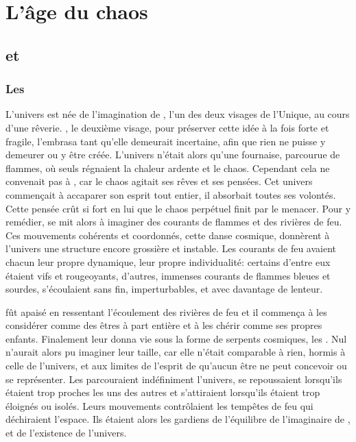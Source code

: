 \chapter{L'âge du chaos}


\section{\Mey et \Cind}


\subsection{Les \SerpentsCosmiques}

L'univers est née de l'imagination de \Mey, l'un des deux visages de l'Unique, au cours d'une rêverie. \Cind, le deuxième visage, pour préserver cette idée à la fois forte et fragile, l'embrasa tant qu'elle demeurait incertaine, afin que rien ne puisse y demeurer ou y être créée. L'univers n'était alors qu'une fournaise, parcourue de flammes, où seuls régnaient la chaleur ardente et le chaos. Cependant cela ne convenait pas à \Mey, car le chaos agitait ses rêves et ses pensées. Cet univers commençait à accaparer son esprit tout entier, il absorbait toutes ses volontés. Cette pensée crût si fort en lui que le chaos perpétuel finit par le menacer. Pour y remédier, \Cind se mit alors à imaginer des courants de flammes et des rivières de feu. Ces mouvements cohérents et coordonnés, cette danse cosmique, donnèrent à l'univers une structure encore grossière et instable. Les courants de feu avaient chacun leur propre dynamique, leur propre individualité: certains d'entre eux étaient vifs et rougeoyants, d'autres, immenses courants de flammes bleues et sourdes, s'écoulaient sans fin, imperturbables, et avec davantage de lenteur.

\Mey fût apaisé en ressentant l'écoulement des rivières de feu et il commença à les considérer comme des êtres à part entière et à les chérir comme ses propres enfants. Finalement \Mey leur donna vie sous la forme de serpents cosmiques, les \SerpentsCosmiques. Nul n'aurait alors pu imaginer leur taille, car elle n'était comparable à rien, hormis à celle de l'univers, et aux limites de l'esprit de \Mey qu'aucun être ne peut concevoir ou se représenter. Les \SerpentsCosmiques parcouraient indéfiniment l'univers, se repoussaient lorsqu'ils étaient trop proches les uns des autres et s'attiraient lorsqu'ils étaient trop éloignés ou isolés. Leurs mouvements contrôlaient les tempêtes de feu qui déchiraient l'espace. Ils étaient alors les gardiens de l'équilibre de l'imaginaire de \Mey, et de l'existence de l'univers.

